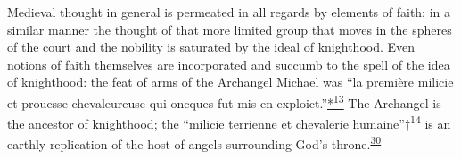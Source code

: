 Medieval thought in general is permeated in all regards by elements of
faith: in a similar manner the thought of that more limited group that
moves in the spheres of the court and the nobility is saturated by the
ideal of knighthood. Even notions of faith themselves are incorporated
and succumb to the spell of the idea of knighthood: the feat of arms of
the Archangel Michael was ``la première milicie et prouesse
chevaleureuse qui oncques fut mis en
\protect\hypertarget{10_Chapter_Three__THE_HEROIC_DREAM.xhtmlux5cux23page_71}{}{}exploict.''\protect\hypertarget{10_Chapter_Three__THE_HEROIC_DREAM.xhtmlux5cux23id_2487}{\protect\hyperlink{23_NOTES.xhtmlux5cux23id_2488}{*\textsuperscript{13}}}
The Archangel is the ancestor of knighthood; the ``milicie terrienne et
chevalerie
humaine''\protect\hypertarget{10_Chapter_Three__THE_HEROIC_DREAM.xhtmlux5cux23id_2489}{\protect\hyperlink{23_NOTES.xhtmlux5cux23id_2490}{†\textsuperscript{14}}}
is an earthly replication of the host of angels surrounding God's
throne.\textsuperscript{\protect\hypertarget{10_Chapter_Three__THE_HEROIC_DREAM.xhtmlux5cux23id_1872}{\protect\hyperlink{23_NOTES.xhtmlux5cux23id_1873}{30}}}

